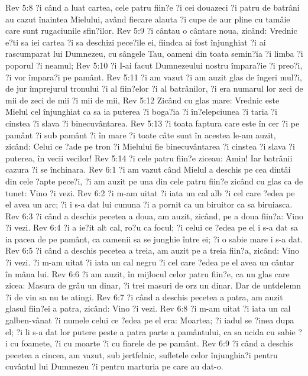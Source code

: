 Rev 5:8  ?i când a luat cartea, cele patru fiin?e ?i cei douazeci ?i patru de batrâni au cazut înaintea Mielului, având fiecare alauta ?i cupe de aur pline cu tamâie care sunt rugaciunile sfin?ilor.
Rev 5:9  ?i cântau o cântare noua, zicând: Vrednic e?ti sa iei cartea ?i sa deschizi pece?ile ei, fiindca ai fost înjunghiat ?i ai rascumparat lui Dumnezeu, cu sângele Tau, oameni din toata semin?ia ?i limba ?i poporul ?i neamul;
Rev 5:10  ?i I-ai facut Dumnezeului nostru împara?ie ?i preo?i, ?i vor împara?i pe pamânt.
Rev 5:11  ?i am vazut ?i am auzit glas de îngeri mul?i, de jur împrejurul tronului ?i al fiin?elor ?i al batrânilor, ?i era numarul lor zeci de mii de zeci de mii ?i mii de mii,
Rev 5:12  Zicând cu glas mare: Vrednic este Mielul cel înjunghiat ca sa ia puterea ?i boga?ia ?i în?elepciunea ?i taria ?i cinstea ?i slava ?i binecuvântarea.
Rev 5:13  ?i toata faptura care este în cer ?i pe pamânt ?i sub pamânt ?i în mare ?i toate câte sunt în acestea le-am auzit, zicând: Celui ce ?ade pe tron ?i Mielului fie binecuvântarea ?i cinstea ?i slava ?i puterea, în vecii vecilor!
Rev 5:14  ?i cele patru fiin?e ziceau: Amin! Iar batrânii cazura ?i se închinara.
Rev 6:1  ?i am vazut când Mielul a deschis pe cea dintâi din cele ?apte pece?i, ?i am auzit pe una din cele patru fiin?e zicând cu glas ca de tunet: Vino ?i vezi.
Rev 6:2  ?i m-am uitat ?i iata un cal alb ?i cel care ?edea pe el avea un arc; ?i i s-a dat lui cununa ?i a pornit ca un biruitor ca sa biruiasca.
Rev 6:3  ?i când a deschis pecetea a doua, am auzit, zicând, pe a doua fiin?a: Vino ?i vezi.
Rev 6:4  ?i a ie?it alt cal, ro?u ca focul; ?i celui ce ?edea pe el i s-a dat sa ia pacea de pe pamânt, ca oamenii sa se junghie între ei; ?i o sabie mare i s-a dat.
Rev 6:5  ?i când a deschis pecetea a treia, am auzit pe a treia fiin?a, zicând: Vino ?i vezi. ?i m-am uitat ?i iata un cal negru ?i cel care ?edea pe el avea un cântar în mâna lui.
Rev 6:6  ?i am auzit, în mijlocul celor patru fiin?e, ca un glas care zicea: Masura de grâu un dinar, ?i trei masuri de orz un dinar. Dar de untdelemn ?i de vin sa nu te atingi.
Rev 6:7  ?i când a deschis pecetea a patra, am auzit glasul fiin?ei a patra, zicând: Vino ?i vezi.
Rev 6:8  ?i m-am uitat ?i iata un cal galben-vânat ?i numele celui ce ?edea pe el era: Moartea; ?i iadul se ?inea dupa el; ?i li s-a dat lor putere peste a patra parte a pamântului, ca sa ucida cu sabie ?i cu foamete, ?i cu moarte ?i cu fiarele de pe pamânt.
Rev 6:9  ?i când a deschis pecetea a cincea, am vazut, sub jertfelnic, sufletele celor înjunghia?i pentru cuvântul lui Dumnezeu ?i pentru marturia pe care au dat-o.
